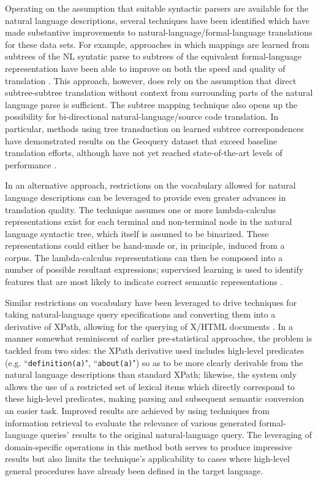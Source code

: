 \documentclass[a4paper,11pt]{proposal}
\begin{document}
Operating on the assumption that suitable syntactic parsers are available for the natural language descriptions, several techniques have been identified which have made substantive improvements to natural-language/formal-language translations for these data sets. For example, approaches in which mappings are learned from subtrees of the NL syntatic parse to subtrees of the equivalent formal-language representation have been able to improve on both the speed and quality of translation \cite{kate2005}. This approach, however, does rely on the assumption that direct subtree-subtree translation without context from surrounding parts of the natural language parse is sufficient. The subtree mapping technique also opens up the possibility for bi-directional natural-language/source code translation. In particular, methods using tree transduction on learned subtree correspondences have demonstrated results on the Geoquery dataset that exceed baseline translation efforts, although have not yet reached state-of-the-art levels of performance \cite{karampatsis2015}.

In an alternative approach, restrictions on the vocabulary allowed for natural language descriptions can be leveraged to provide even greater advances in translation quality. The technique assumes one or more lambda-calculus representations exist for each terminal and non-terminal node in the natural language syntactic tree, which itself is assumed to be binarized. These representations could either be hand-made or, in principle, induced from a corpus. The lambda-calculus representations can then be composed into a number of possible resultant expressions; supervised learning is used to identify features that are most likely to indicate correct semantic representations \cite{ge2009}.

Similar restrictions on vocabulary have been leveraged to drive techniques for taking natural-language query specifications and converting them into a derivative of XPath, allowing for the querying of X/HTML documents \cite{tannier2005}. In a manner somewhat reminiscent of earlier pre-statistical approaches, the problem is tackled from two sides: the XPath derivative used includes high-level predicates (e.g. ``\texttt{definition(a)}", ``\texttt{about(a)}") so as to be more clearly derivable from the natural language descriptions than standard XPath; likewise, the system only allows the use of a restricted set of lexical items which directly correspond to these high-level predicates, making parsing and subsequent semantic conversion an easier task. Improved results are achieved by using techniques from information retrieval to evaluate the relevance of various generated formal-language queries' results to the original natural-language query. The leveraging of domain-specific operations in this method both serves to produce impressive results but also limits the technique's applicability to cases where high-level general procedures have already been defined in the target language.
\end{document}

